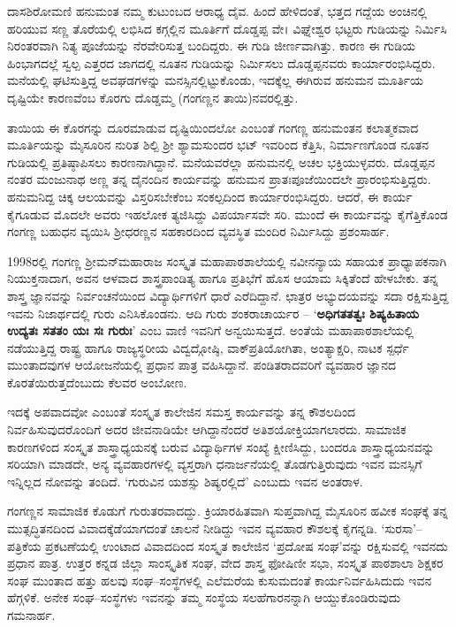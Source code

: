 ದಾಸಶಿರೋಮಣಿ ಹನುಮಂತ ನಮ್ಮ ಕುಟುಂಬದ ಆರಾಧ್ಯ ದೈವ. ಹಿಂದೆ ಹೇಳಿದಂತೆ, ಭತ್ತದ ಗದ್ದೆಯ ಅಂಚಿನಲ್ಲಿ ಹರಿಯುವ ಸಣ್ಣ ತೊರೆಯಲ್ಲಿ ಲಭಿಸಿದ ಕಗ್ಗಲ್ಲಿನ ಮೂರ್ತಿಗೆ ದೊಡ್ಡಪ್ಪ ವೇ। ವಿಘ್ನೇಶ್ವರ ಭಟ್ಟರು ಗುಡಿಯನ್ನು ನಿರ್ಮಿಸಿ ನಿರಂತರವಾಗಿ ನಿತ್ಯ ಪೂಜೆಯನ್ನು ನೆರವೇರಿಸುತ್ತ ಬಂದಿದ್ದರು. ಈ ಗುಡಿ ಜೀರ್ಣವಾಗಿತ್ತು. ಕಾರಣ ಈ ಗುಡಿಯ ಹಿಂಭಾಗದಲ್ಲೆ ಸ್ವಲ್ಪ ಎತ್ತರದ ಜಾಗದಲ್ಲಿ ನೂತನ ಗುಡಿಯನ್ನು ನಿರ್ಮಿಸಲು ದೊಡ್ಡಪ್ಪನವರು ಕಾರ್ಯಾರಂಭಿಸಿದ್ದರು. ಮನೆಯಲ್ಲಿ ಘಟಿಸುತ್ತಿದ್ದ ಅವಘಡಗಳನ್ನು ಮನಸ್ಸಿನಲ್ಲಿಟ್ಟುಕೊಂಡು, ಇದಕ್ಕೆಲ್ಲ ಈಗಿರುವ ಹನುಮನ ಮೂರ್ತಿಯ ದೃಷ್ಟಿಯೇ ಕಾರಣವೆಂಬ ಕೊರಗು ದೊಡ್ಡಮ್ಮ (ಗಂಗಣ್ಣನ ತಾಯಿ)ನವರಲ್ಲಿತ್ತು. 

ತಾಯಿಯ ಈ ಕೊರಗನ್ನು ದೂರಮಾಡುವ ದೃಷ್ಟಿಯಿಂದಲೋ ಎಂಬಂತೆ ಗಂಗಣ್ಣ ಹನುಮಂತನ ಕಲಾತ್ಮಕವಾದ ಮೂರ್ತಿಯನ್ನು ಮೈಸೂರಿನ ನುರಿತ ಶಿಲ್ಪಿ ಶ್ರೀ ಶ್ಯಾಮಸುಂದರ ಭಟ್ ಇವರಿಂದ ಕೆತ್ತಿಸಿ, ನಿರ್ಮಾಣಗೊಂಡ ನೂತನ ಗುಡಿಯಲ್ಲಿ ಪ್ರತಿಷ್ಠಾಪಿಸಲು ಕಾರಣನಾಗಿದ್ದಾನೆ. ಮನೆಯವರೆಲ್ಲಾ ಹನುಮನಲ್ಲಿ ಅಚಲ ಭಕ್ತಿಯುಳ್ಳವರು. ದೊಡ್ಡಪ್ಪನ ನಂತರ ಮಂಜುನಾಥ ಅಣ್ಣ ತನ್ನ ದೈನಂದಿನ ಕಾರ್ಯವನ್ನು ಹನುಮನ ಪ್ರಾತಃಪೂಜೆಯಿಂದಲೇ ಪ್ರಾರಂಭಿಸುತ್ತಿದ್ದರು. ಹನುಮನಿದ್ದ ಚಿಕ್ಕ ಆಲಯವನ್ನು ವಿಸ್ತರಿಸಬೇಕೆಂಬ ಸಂಕಲ್ಪದಿಂದ ಕಾರ್ಯಾರಂಭಿಸಿದ್ದರು. ಆದರೆ, ಈ ಕಾರ್ಯ ಕೈಗೂಡುವ ಮೊದಲೇ ಅವರು ಇಹಲೋಕ ತ್ಯಜಿಸಿದ್ದು ವಿಪರ್ಯಾಸವೇ ಸರಿ. ಮುಂದೆ ಈ ಕಾರ್ಯವನ್ನು ಕೈಗೆತ್ತಿಕೊಂಡ ಗಂಗಣ್ಣ ಬಹುಧನ ವ್ಯಯಿಸಿ ಶ್ರೀಧರಣ್ಣನ ಸಹಕಾರದಿಂದ ವ್ಯವಸ್ಥಿತ ಮಂದಿರ ನಿರ್ಮಿಸಿದ್ದು ಪ್ರಶಂಸಾರ್ಹ.

1998ರಲ್ಲಿ ಗಂಗಣ್ಣ ಶ್ರೀಮನ್‍ಮಹಾರಾಜ ಸಂಸ್ಕೃತ ಮಹಾಪಾಠಶಾಲೆಯಲ್ಲಿ ನವೀನನ್ಯಾಯ ಸಹಾಯಕ ಪ್ರಾಧ್ಯಾಪಕನಾಗಿ ನಿಯುಕ್ತನಾದಾಗ, ಅವನ ಆಳವಾದ ಶಾಸ್ತ್ರಪಾಂಡಿತ್ಯ ಹಾಗೂ ಪ್ರತಿಭೆಗೆ ಹೊಸ ಆಯಾಮ ಸಿಕ್ಕಿತೆಂದೆ ಹೇಳಬೇಕು. ತನ್ನ ಶಾಸ್ತ್ರ ಜ್ಞಾನವನ್ನು ನಿರ್ವಂಚನೆಯಿಂದ ವಿದ್ಯಾರ್ಥಿಗಳಿಗೆ ಧಾರೆ ಎರೆದಿದ್ದಾನೆ. ಛಾತ್ರರ ಅಭ್ಯುದಯವನ್ನು ಸದಾ ರಕ್ಷಿಸುತ್ತಿದ್ದ  ಇವನು ನಿಜಾರ್ಥದಲ್ಲಿ ಗುರು ಎನಿಸಿಕೊಂಡನು. ಆದಿ ಗುರು ಶಂಕರಾಚಾರ್ಯರ – ‘\textbf{ಅಧಿಗತತತ್ವಃ ಶಿಷ್ಯಹಿತಾಯ ಉದ್ಯತಃ ಸತತಂ ಯಃ ಸಃ ಗುರುಃ}’ ಎಂಬ ವಾಣಿ ಇವನಿಗೆ ಅನ್ವಯಿಸುತ್ತದೆ. ಅಂತೆಯೆ ಮಹಾಪಾಠಶಾಲೆಯಲ್ಲಿ ನಡೆಯುತ್ತಿದ್ದ ರಾಷ್ಟ್ರ ಹಾಗೂ ರಾಜ್ಯಸ್ಥರೀಯ ವಿದ್ವದ್ಗೋಷ್ಠಿ, ವಾಕ್‍ಪ್ರತಿಯೋಗಿತಾ, ಅಂತ್ಯಾಕ್ಷರಿ, ನಾಟಕ ಸ್ಪರ್ಧೆ ಮುಂತಾದವುಗಳ ಆಯೋಜನೆಯಲ್ಲಿ ಪ್ರಧಾನ ಪಾತ್ರ ವಹಿಸಿದ್ದಾನೆ. ಪಂಡಿತರಾದವರಿಗೆ ವ್ಯವಹಾರ ಜ್ಞಾನದ ಕೊರತೆಯಿರುತ್ತದೆಂಬುದು ಕೆಲವರ ಅಂಬೋಣ. 

ಇದಕ್ಕೆ ಅಪವಾದವೋ ಎಂಬಂತೆ ಸಂಸ್ಕೃತ ಕಾಲೇಜಿನ ಸಮಸ್ತ ಕಾರ್ಯವನ್ನು ತನ್ನ ಕೌಶಲದಿಂದ ನಿರ್ವಹಿಸುವುದರೊಂದಿಗೆ ಅದರ ಜೀವನಾಡಿಯೇ ಆಗಿದ್ದಾನೆಂದರೆ ಅತಿಶಯೋಕ್ತಿಯಾಗಲಾರದು. ಸಾಮಾಜಿಕ ಕಾರಣಗಳಿಂದ ಸಂಸ್ಕೃತ ಶಾಸ್ತ್ರಾಧ್ಯಯನಕ್ಕೆ ಬರುವ ವಿದ್ಯಾರ್ಥಿಗಳ ಸಂಖ್ಯೆ ಕ್ಷೀಣಿಸಿದ್ದು, ಬಂದರೂ ಶಾಸ್ತ್ರಾಧ್ಯಯನವನ್ನು ಸರಿಯಾಗಿ ಮಾಡದೇ, ಅನ್ಯ ವ್ಯವಹಾರಗಳಲ್ಲಿ ವ್ಯಸ್ತರಾಗಿ ಧನಾರ್ಜನೆಯಲ್ಲಿ ತೊಡಗುತ್ತಿರುವುದು ಇವನ ಮನಸ್ಸಿಗೆ ಇನ್ನಿಲ್ಲದ ನೋವನ್ನು ತಂದಿದೆ. ‘ಗುರುವಿನ ಯಶಸ್ಸು ಶಿಷ್ಯರಲ್ಲಿದೆ’ ಎಂಬುದು ಇವನ ಅಂತರಾಳ.

ಗಂಗಣ್ಣನ ಸಾಮಾಜಿಕ ಕೊಡುಗೆ ಗುರುತರವಾದದ್ದು. ಕ್ರಿಯಾರಹಿತವಾಗಿ ಸುಪ್ತವಾಗಿದ್ದ ಮೈಸೂರಿನ ಹವೀಕ ಸಂಘಕ್ಕೆ ತನ್ನ ಮುತ್ಸದ್ಧಿತನದಿಂದ ವಿವಾದಕ್ಕೆಡೆಯಾಗದಂತೆ ಚಾಲನೆ ನೀಡಿದ್ದು ಇವನ ವ್ಯವಹಾರ ಕೌಶಲಕ್ಕೆ ಕೈಗನ್ನಡಿ. ‘ಸುರಸಾ’–ಪತ್ರಿಕೆಯ ಪ್ರಕಟಣೆಯಲ್ಲಿ ಉಂಟಾದ ವಿವಾದದಿಂದ ಸಂಸ್ಕೃತ ಕಾಲೇಜಿನ ‘ಪ್ರದೋಷ ಸಂಘ’ವನ್ನು ರಕ್ಷಿಸುವಲ್ಲಿ ಇವನದು ಪ್ರಧಾನ ಪಾತ್ರ. ಉತ್ತರ ಕನ್ನಡ ಜಿಲ್ಲಾ ಸಾಂಸ್ಕೃತಿಕ ಸಂಘ, ವೇದ ಶಾಸ್ತ್ರ  ಫೋಷಿಣೀ ಸಭಾ, ಸಂಸ್ಕೃತ ಪಾಠಶಾಲಾ ಶಿಕ್ಷಕರ ಸಂಘ ಮುಂತಾದ ಹತ್ತು ಹಲವು ಸಂಘ–ಸಂಸ್ಥೆಗಳಲ್ಲಿ ಎಲೆಮರೆಯ ಕುಸುಮದಂತೆ ಕಾರ್ಯನಿರ್ವಹಿಸಿದುದು ಇವನ ಹೆಗ್ಗಳಿಕೆ. ಅನೇಕ ಸಂಘ–ಸಂಸ್ಥೆಗಳು ಇವನನ್ನು ತಮ್ಮ ಸಂಸ್ಥೆಯ ಸಲಹೆಗಾರನನ್ನಾಗಿ ಆಯ್ದುಕೊಂಡಿರುವುದು ಗಮನಾರ್ಹ.

